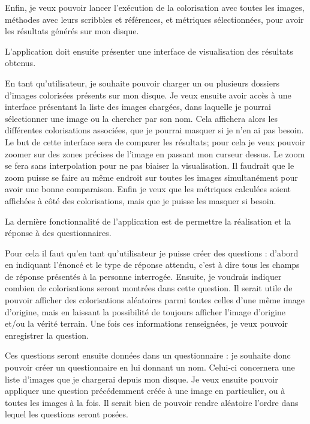 \documentclass{article}
\begin{document}
Enfin, je veux pouvoir lancer l'exécution de la colorisation avec toutes les images, méthodes avec leurs scribbles et références, et métriques sélectionnées, pour avoir les résultats générés sur mon disque.
\newline

L'application doit ensuite présenter une interface de visualisation des résultats obtenus.

En tant qu'utilisateur, je souhaite pouvoir charger un ou plusieurs dossiers d'images colorisées présents sur mon disque.
Je veux ensuite avoir accès à une interface présentant la liste des images chargées, dans laquelle je pourrai sélectionner une image ou la chercher par son nom.
Cela affichera alors les différentes colorisations associées, que je pourrai masquer si je n'en ai pas besoin.
Le but de cette interface sera de comparer les résultats; pour cela je veux pouvoir zoomer sur des zones précises de l'image en passant mon curseur dessus. Le zoom se fera sans interpolation pour ne pas biaiser la visualisation.
Il faudrait que le zoom puisse se faire au même endroit sur toutes les images simultanément pour avoir une bonne comparaison.
Enfin je veux que les métriques calculées soient affichées à côté des colorisations, mais que je puisse les masquer si besoin.
\newline

La dernière fonctionnalité de l'application est de permettre la réalisation et la réponse à des questionnaires.

Pour cela il faut qu'en tant qu'utilisateur je puisse créer des questions : d'abord en indiquant l'énoncé et le type de réponse attendu, c'est à dire tous les champs de réponse présentés à la personne interrogée.
Ensuite, je voudrais indiquer combien de colorisations seront montrées dans cette question. Il serait utile de pouvoir afficher des colorisations aléatoires parmi toutes celles d'une même image d'origine, mais en laissant la possibilité de toujours afficher l'image d'origine et/ou la vérité terrain.
Une fois ces informations renseignées, je veux pouvoir enregistrer la question.

Ces questions seront ensuite données dans un questionnaire : je souhaite donc pouvoir créer un questionnaire en lui donnant un nom.
Celui-ci concernera une liste d'images que je chargerai depuis mon disque. Je veux ensuite pouvoir appliquer une question précédemment créée à une image en particulier, ou à toutes les images à la fois.
Il serait bien de pouvoir rendre aléatoire l'ordre dans lequel les questions seront posées.
\end{document}
